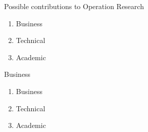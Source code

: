 \documentclass{beamer}
\begin{document}
\begin{frame}[t]{}
    \begin{block}{Possible contributions to Operation Research}
        \begin{enumerate}
            \item Business
            \item Technical
            \item Academic
        \end{enumerate}
    \end{block}
\end{frame}

\begin{frame}{}
    \begin{block}{Business}
        \begin{enumerate}
            \item Business
            \item Technical
            \item Academic
        \end{enumerate}
    \end{block}
\end{frame}
\end{document}
